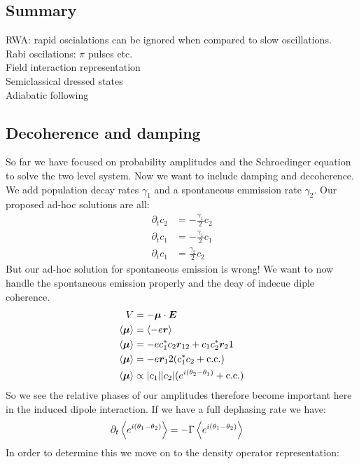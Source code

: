 \subsection{Summary}
RWA: rapid oscialations can be ignored when compared to slow oscillations.\\
Rabi oscilations: $\pi$ pulses etc. \\
Field interaction representation \\
Semiclassical dressed states \\
Adiabatic following \\
\subsection{Decoherence and damping}
So far we have focused on probability amplitudes and the Schroedinger equation to solve the two level system. Now we want to include damping and decoherence. We add population decay rates $\gamma_1$ and a spontaneous emmission rate $\gamma_2$. Our proposed ad-hoc solutions are all:
\begin{align*}
	\partial_t c_2 &= -\frac{\gamma_1}{2} c_2  \\
	\partial_t c_1 &= -\frac{\gamma_1}{2} c_1 \\
	\partial_t c_1 &= \frac{\gamma_2}{2} c_2
\end{align*}
But our ad-hoc solution for spontaneous emission is wrong! We want to now handle the spontaneous emission properly and the deay of indecue diple coherence. 
\begin{align*}
	V &= -\bm{\mu}\cdot \bm{E} \\
	\expval{\bm{\mu}} &= \expval{-e\bm{r}} \\
	\expval{\bm{\mu}} &= -ec_1^*c_2\bm{r}_{12} + c_1c_2^*\bm{r}_21 \\
	\expval{\bm{\mu}} &= -e\bm{r}_12 (c_1^*c_2 + \text{c.c.}) \\
	\expval{\bm{\mu}} &\propto |c_1||c_2|(e^{i(\theta_2 - \theta_1)} + \text{c.c.})
\end{align*}
So we see the relative phases of our amplitudes therefore become important here in the induced dipole interaction. If we have a full dephasing rate we have:
\begin{align*}
	\partial_t \expval{e^{i(\theta_1 - \theta_2)}} &= -\Gamma\expval{e^{i(\theta_1 - \theta_2)}} 
\end{align*}
In order to determine this we move on to the density operator representation:
